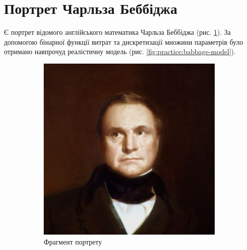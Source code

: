 \section{Портрет Чарльза Беббіджа}

Є портрет відомого англійського математика Чарльза Беббіджа
(рис. \ref{fig:practice:babbage}).
За допомогою бінарної функції витрат та дискретизації множини параметрів
було отримано навпрочуд реалістичну модель
(рис. \ref{fig:practice:babbage-model}).

\begin{figure}[h]
  \centering
  \begin{subfigure}[b]{0.4\textwidth}
    \centering
    \includegraphics[width=\textwidth]{images/babbage}
    \caption{Фрагмент портрету}
    \label{fig:practice:babbage}
  \end{subfigure}
  \begin{subfigure}[b]{0.4\textwidth}
    \centering

\end{subfigure}
\end{figure}

